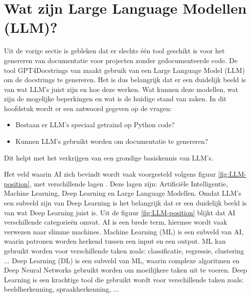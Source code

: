 \begin{table}[h!]
  \centering
  \caption{Overzicht van wat de tools kunnen genereren}
  \label{table:ra-tools}
  \end{table}

\section{Wat zijn Large Language Modellen (LLM)?}
\label{sec:wat-zijn-llms}

Uit de vorige sectie is gebleken dat er slechts één tool geschikt is voor het genereren van documentatie voor projecten zonder gedocumenteerde code. 
De tool GPT4Docstrings van \textcite{Trofficus2023} maakt gebruik van een Large Language Model (LLM) om de docstrings te genereren.
Het is dus belangrijk dat er een duidelijk beeld is van wat LLM's juist zijn en hoe deze werken.
Wat kunnen deze modellen, wat zijn de mogelijke beperkingen en wat is de huidige stand van zaken. 
In dit hoofdstuk wordt er een antwoord gegeven op de vragen: 
\begin{itemize}
  \item Bestaan er LLM's speciaal getraind op Python code? 
  \item Kunnen LLM's gebruikt worden om documentatie te genereren?
\end{itemize}
Dit helpt met het verkrijgen van een grondige basiskennis van LLM's. 

Het veld waarin AI zich bevindt wordt vaak voorgesteld volgens figuur \ref{fig:LLM-position}, met verschillende lagen \autocite{Stoeffelbauer2023}.
Deze lagen zijn: Artificiële Intelligentie, Machine Learning, Deep Learning en Large Language Modellen.
Omdat LLM's een subveld zijn van Deep Learning is het belangrijk dat er een duidelijk beeld is van wat Deep Learning juist is.
Uit de figuur \ref{fig:LLM-position} blijkt dat AI verschillende categorieën omvat.
AI is een brede term, hiermee wordt vaak verwezen naar slimme machines. 
Machine Learning (ML) is een subveld van AI, waarin patronen worden herkend tussen een input en een output.
ML kan gebruikt worden voor verschillende taken zoals: classificatie, regressie, clustering ...
Deep Learning (DL) is een subveld van ML, waarin complexe algoritmen en Deep Neural Networks gebruikt worden om moeilijkere taken uit te voeren.
Deep Learning is een krachtige tool die gebruikt wordt voor verschillende taken zoals: beeldherkenning, spraakherkenning, ... \autocite{Stoeffelbauer2023}

